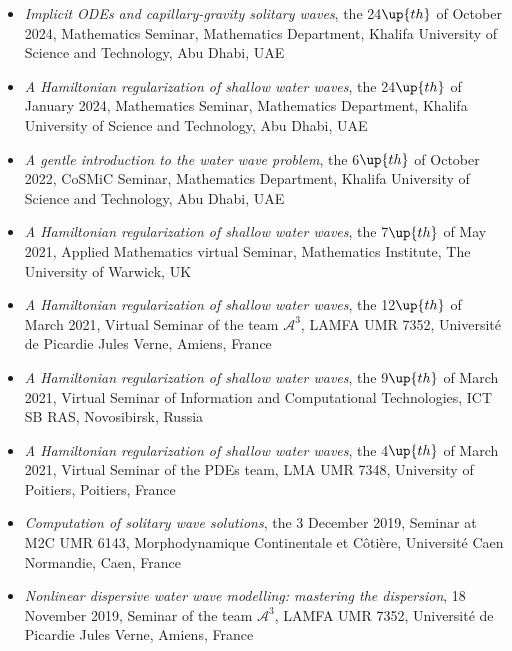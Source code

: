 \documentclass[final, a4paper, oneside, 12pt]{article}
\numberwithin{equation}{section}
\begin{document}
\begin{itemize}

  \item \textit{Implicit ODEs and capillary-gravity solitary waves}, the 24$\up{th}$ of October 2024, Mathematics Seminar, Mathematics Department, Khalifa University of Science and Technology, Abu Dhabi, UAE

  \item \textit{A Hamiltonian regularization of shallow water waves}, the 24$\up{th}$ of January 2024, Mathematics Seminar, Mathematics Department, Khalifa University of Science and Technology, Abu Dhabi, UAE

  \item \textit{A gentle introduction to the water wave problem}, the 6$\up{th}$ of October 2022, CoSMiC Seminar, Mathematics Department, Khalifa University of Science and Technology, Abu Dhabi, UAE

  \item \textit{A Hamiltonian regularization of shallow water waves}, the 7$\up{th}$ of May 2021, Applied Mathematics virtual Seminar, Mathematics Institute, The University of Warwick, UK

  \item \textit{A Hamiltonian regularization of shallow water waves}, the 12$\up{th}$ of March 2021, Virtual Seminar of the team $\mathcal{A}^3$, LAMFA UMR 7352, Universit\'e de Picardie Jules Verne, Amiens, France

  \item \textit{A Hamiltonian regularization of shallow water waves}, the 9$\up{th}$ of March 2021, Virtual Seminar of Information and Computational Technologies, ICT SB RAS, Novosibirsk, Russia

  \item \textit{A Hamiltonian regularization of shallow water waves}, the 4$\up{th}$ of March 2021, Virtual Seminar of the PDEs team, LMA UMR 7348, University of Poitiers, Poitiers, France

  \item \textit{Computation of solitary wave solutions}, the 3 December 2019, Seminar at M2C UMR 6143, Morphodynamique Continentale et C\^oti\`ere, Universit\'e Caen Normandie, Caen, France

  \item \textit{Nonlinear dispersive water wave modelling: mastering the dispersion}, 18 November 2019, Seminar of the team $\mathcal{A}^3$, LAMFA UMR 7352, Universit\'e de Picardie Jules Verne, Amiens, France


\end{itemize}
\end{document}

